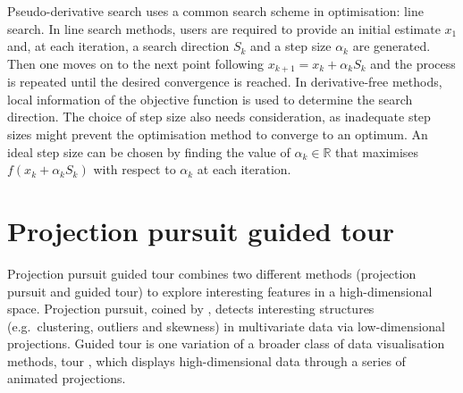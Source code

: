 Pseudo-derivative search uses a common search scheme in optimisation:
line search. In line search methods, users are required to provide an
initial estimate \(x_{1}\) and, at each iteration, a search direction
\(S_k\) and a step size \(\alpha_k\) are generated. Then one moves on to
the next point following \(x_{k+1} = x_k + \alpha_kS_k\) and the process
is repeated until the desired convergence is reached. In derivative-free
methods, local information of the objective function is used to
determine the search direction. The choice of step size also needs
consideration, as inadequate step sizes might prevent the optimisation
method to converge to an optimum. An ideal step size can be chosen by
finding the value of \(\alpha_k \in \mathbb{R}\) that maximises
\(f(x_k + \alpha_kS_k)\) with respect to \(\alpha_k\) at each iteration.

\hypertarget{tour}{%
\section{Projection pursuit guided tour}\label{tour}}

Projection pursuit guided tour combines two different methods
(projection pursuit and guided tour) to explore interesting features in
a high-dimensional space. Projection pursuit, coined by
\citet{friedman1974projection}, detects interesting structures
(e.g.~clustering, outliers and skewness) in multivariate data via
low-dimensional projections. Guided tour \citep{cook1995grand} is one
variation of a broader class of data visualisation methods, tour
\citep{buja2005computational}, which displays high-dimensional data
through a series of animated projections.

